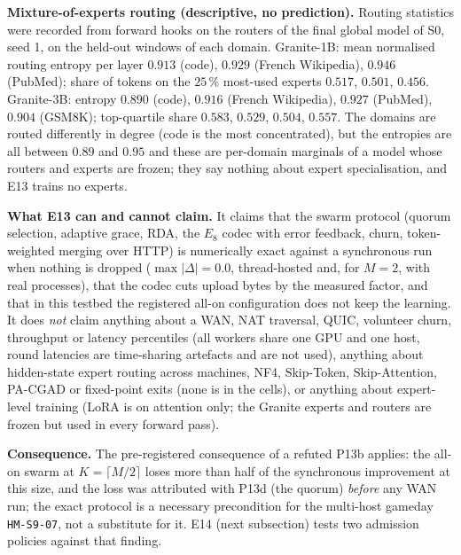 \documentclass[11pt,a4paper]{article}
\begin{document}
\textbf{Mixture-of-experts routing (descriptive, no prediction).} Routing statistics were recorded from forward hooks on the routers of the final global model of S0, seed 1, on the held-out windows of each domain. Granite-1B: mean normalised routing entropy per layer $0.913$ (code), $0.929$ (French Wikipedia), $0.946$ (PubMed); share of tokens on the $25\,\%$ most-used experts $0.517$, $0.501$, $0.456$. Granite-3B: entropy $0.890$ (code), $0.916$ (French Wikipedia), $0.927$ (PubMed), $0.904$ (GSM8K); top-quartile share $0.583$, $0.529$, $0.504$, $0.557$. The domains are routed differently in degree (code is the most concentrated), but the entropies are all between $0.89$ and $0.95$ and these are per-domain marginals of a model whose routers and experts are frozen; they say nothing about expert specialisation, and E13 trains no experts.

\textbf{What E13 can and cannot claim.} It claims that the swarm protocol (quorum selection, adaptive grace, RDA, the $E_8$ codec with error feedback, churn, token-weighted merging over HTTP) is numerically exact against a synchronous run when nothing is dropped ($\max|\Delta|=0.0$, thread-hosted and, for $M=2$, with real processes), that the codec cuts upload bytes by the measured factor, and that in this testbed the registered all-on configuration does not keep the learning. It does \emph{not} claim anything about a WAN, NAT traversal, QUIC, volunteer churn, throughput or latency percentiles (all workers share one GPU and one host, round latencies are time-sharing artefacts and are not used), anything about hidden-state expert routing across machines, NF4, Skip-Token, Skip-Attention, PA-CGAD or fixed-point exits (none is in the cells), or anything about expert-level training (LoRA is on attention only; the Granite experts and routers are frozen but used in every forward pass).

\textbf{Consequence.} The pre-registered consequence of a refuted P13b applies: the all-on swarm at $K=\lceil M/2\rceil$ loses more than half of the synchronous improvement at this size, and the loss was attributed with P13d (the quorum) \emph{before} any WAN run; the exact protocol is a necessary precondition for the multi-host gameday \texttt{HM-S9-07}, not a substitute for it. E14 (next subsection) tests two admission policies against that finding.
\end{document}
